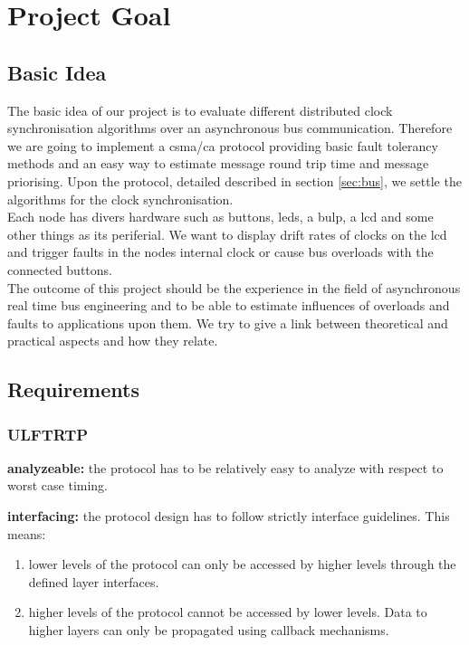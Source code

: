 \section{Project Goal}

\subsection{Basic Idea}
The basic idea of our project is to evaluate different distributed clock synchronisation algorithms over an asynchronous bus communication. Therefore we are going to implement a csma/ca protocol providing basic fault tolerancy methods and an easy way to estimate message round trip time and message priorising.
Upon the protocol, detailed described in section \ref{sec:bus}, we settle the algorithms for the clock synchronisation.\\

Each node has divers hardware such as buttons, leds, a bulp, a lcd and some other things as its periferial. We want to display drift rates of clocks on the lcd and trigger faults in the nodes internal clock or cause bus overloads with the connected buttons.\\

The outcome of this project should be the experience in the field of asynchronous real time bus engineering and to be able to estimate influences of overloads and faults to applications upon them.
We try to give a link between theoretical and practical aspects and how they relate.

\subsection{Requirements}

\subsubsection{ULFTRTP}
\begin{req}
\label{req:ulftrtp:analyzeable}
\textbf{analyzeable: }the protocol has to be relatively easy to analyze with respect to worst case timing.
\end{req}

\begin{req}
\label{req:ulftrtp:interfacing}
\textbf{interfacing: }the protocol design has to follow strictly interface guidelines. This means:
\begin{enumerate}
 \item lower levels of the protocol can only be accessed by higher levels through the defined layer interfaces.
 \item higher levels of the protocol cannot be accessed by lower levels. Data to higher layers can only be propagated using callback mechanisms. 
\end{enumerate}

\end{req}

